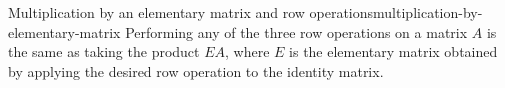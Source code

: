 \begin{theorem}{Multiplication by an elementary matrix and row operations}{multiplication-by-elementary-matrix}
  Performing any of the three row operations on a matrix $A$ is the
  same as taking the product $EA$, where $E$ is the elementary matrix
  obtained by applying the desired row operation to the identity
  matrix.
\end{theorem}

